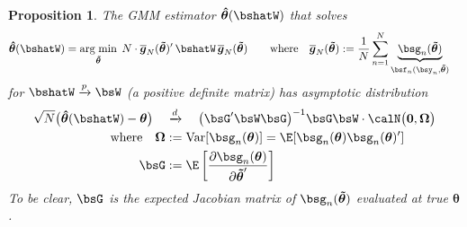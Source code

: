 \documentclass[12pt]{article}
\theoremstyle{plain}
\newtheorem{prop}[thm]{Proposition}
\theoremstyle{definition}
\theoremstyle{remark}
\newcommand{\bstheta}{\boldsymbol{\theta}}
\newcommand{\bsOmega}{\boldsymbol{\Omega}}
\newcommand{\bshattheta}{\boldsymbol{\hat{\theta}}}
\newcommand{\bstildetheta}{\boldsymbol{\tilde{\theta}}}
\newcommand{\bsbarg}{\boldsymbol{\overline{g}}}
\renewcommand{\bso}{\boldsymbol{0}}
\DeclareMathOperator*{\argmin}{arg\;min}
\newcommand{\Var}{\operatorname{Var}}
\newcommand{\pto}{\xrightarrow{p}}
\newcommand{\dto}{\xrightarrow{d}}
\newcommand{\sumnN}{\sum^N_{n=1}}
\begin{document}
\begin{prop}
The GMM estimator $\bshattheta(\bshatW)$ that solves
\begin{align*}
  \bshattheta(\bshatW)
  &=
  \argmin_{\bstildetheta}\;
  N \cdot \bsbarg_N(\bstildetheta)' \,\bshatW \,\bsbarg_N(\bstildetheta)
  \qquad
  \text{where}\quad
  \bsbarg_N(\bstildetheta)
  := \frac{1}{N}\sumnN
  \underbrace{\bsg_n(\bstildetheta)}_{\bsf_n(\bsy_n,\bstildetheta)}
\end{align*}
for $\bshatW\pto\bsW$ (a positive definite matrix)
has asymptotic distribution
\begin{align*}
  \sqrt{N}\big(\bshattheta(\bshatW)-\bstheta\big)
  \quad&\dto\quad
  \big( \bsG' \bsW \bsG \big)^{-1}
  \bsG \bsW
  \cdot
  \calN\big(\bso,\bsOmega\big)
  \\
  \text{where}\quad
  \bsOmega &:= \Var[\bsg_n(\bstheta)]
  = \E[\bsg_n(\bstheta)\bsg_n(\bstheta)']
  \\
  \bsG &:= \E\left[
    \frac{\partial \bsg_n(\bstheta)}{\partial \bstildetheta'}
  \right]
\end{align*}
To be clear, $\bsG$ is the expected Jacobian matrix of
$\bsg_n(\bstildetheta)$ evaluated at true $\bstheta$.
\end{prop}
\end{document}
